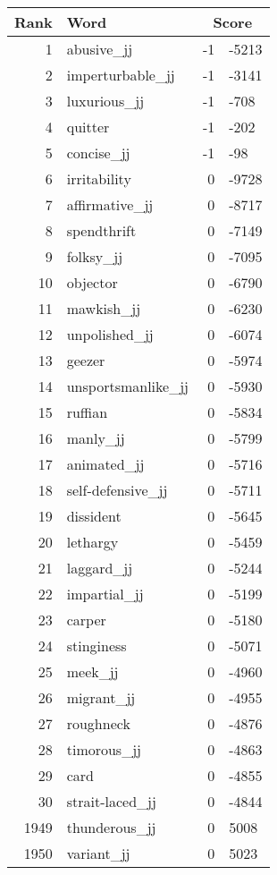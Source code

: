 \begin{longtable}[!htbp]{| rlr@{.}l |}
    \hline
    \textbf{Rank} & \textbf{Word} & \multicolumn{2}{c|}{\textbf{Score}} \\
    \hline
    \endhead
    1 & abusive\_jj & -1 & -5213 \\
    2 & imperturbable\_jj & -1 & -3141 \\
    3 & luxurious\_jj & -1 & -708 \\
    4 & quitter & -1 & -202 \\
    5 & concise\_jj & -1 & -98 \\
    6 & irritability & 0 & -9728 \\
    7 & affirmative\_jj & 0 & -8717 \\
    8 & spendthrift & 0 & -7149 \\
    9 & folksy\_jj & 0 & -7095 \\
    10 & objector & 0 & -6790 \\
    11 & mawkish\_jj & 0 & -6230 \\
    12 & unpolished\_jj & 0 & -6074 \\
    13 & geezer & 0 & -5974 \\
    14 & unsportsmanlike\_jj & 0 & -5930 \\
    15 & ruffian & 0 & -5834 \\
    16 & manly\_jj & 0 & -5799 \\
    17 & animated\_jj & 0 & -5716 \\
    18 & self-defensive\_jj & 0 & -5711 \\
    19 & dissident & 0 & -5645 \\
    20 & lethargy & 0 & -5459 \\
    21 & laggard\_jj & 0 & -5244 \\
    22 & impartial\_jj & 0 & -5199 \\
    23 & carper & 0 & -5180 \\
    24 & stinginess & 0 & -5071 \\
    25 & meek\_jj & 0 & -4960 \\
    26 & migrant\_jj & 0 & -4955 \\
    27 & roughneck & 0 & -4876 \\
    28 & timorous\_jj & 0 & -4863 \\
    29 & card & 0 & -4855 \\
    30 & strait-laced\_jj & 0 & -4844 \\
    1949 & thunderous\_jj & 0 & 5008 \\
    1950 & variant\_jj & 0 & 5023 \\

\end{longtable}
